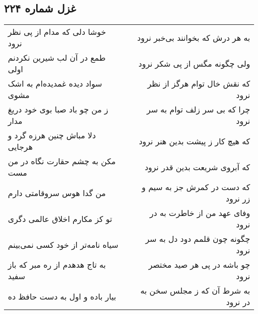 \begin{center}
\section*{غزل شماره ۲۲۴}
\label{sec:sh224}
\begin{longtable}{l p{0.5cm} r}
خوشا دلی که مدام از پی نظر نرود
&&
به هر درش که بخوانند بی‌خبر نرود
\\
طمع در آن لب شیرین نکردنم اولی
&&
ولی چگونه مگس از پی شکر نرود
\\
سواد دیده غمدیده‌ام به اشک مشوی
&&
که نقش خال توام هرگز از نظر نرود
\\
ز من چو باد صبا بوی خود دریغ مدار
&&
چرا که بی سر زلف توام به سر نرود
\\
دلا مباش چنین هرزه گرد و هرجایی
&&
که هیچ کار ز پیشت بدین هنر نرود
\\
مکن به چشم حقارت نگاه در من مست
&&
که آبروی شریعت بدین قدر نرود
\\
من گدا هوس سروقامتی دارم
&&
که دست در کمرش جز به سیم و زر نرود
\\
تو کز مکارم اخلاق عالمی دگری
&&
وفای عهد من از خاطرت به در نرود
\\
سیاه نامه‌تر از خود کسی نمی‌بینم
&&
چگونه چون قلمم دود دل به سر نرود
\\
به تاج هدهدم از ره مبر که باز سفید
&&
چو باشه در پی هر صید مختصر نرود
\\
بیار باده و اول به دست حافظ ده
&&
به شرط آن که ز مجلس سخن به در نرود
\\
\end{longtable}
\end{center}
